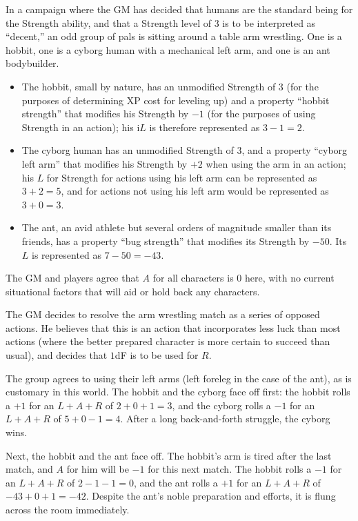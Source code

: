 \begin{example}
In a campaign where the GM has decided that humans are the standard being for the Strength ability,
and that a Strength level of 3 is to be interpreted as ``decent,'' an odd group of pals is sitting around a table arm wrestling.
One is a hobbit, one is a cyborg human with a mechanical left arm, and one is an ant bodybuilder.
\begin{itemize}
\item The hobbit, small by nature, has an unmodified Strength of $3$ (for the purposes of determining XP cost for leveling up) and a property
``hobbit strength'' that modifies his Strength by $-1$ (for the purposes of using Strength in an action); his i$L$ is therefore represented as $3-1=2$.
\item The cyborg human has an unmodified Strength of $3$, and a property ``cyborg left arm'' that modifies his Strength by $+2$ when using the arm in an action;
his $L$ for Strength for actions using his left arm can be represented as $3+2=5$, and for actions not using his left arm would be represented as $3+0=3$.
\item The ant, an avid athlete but several orders of magnitude smaller than its friends, has a property ``bug strength'' that modifies its Strength by $-50$.
Its $L$ is represented as $7-50=-43$.
\end{itemize}
The GM and players agree that $A$ for all characters is $0$ here, with no current situational factors that will aid or hold back any characters.

The GM decides to resolve the arm wrestling match as a series of opposed actions.
He believes that this is an action that incorporates less luck than most actions (where the better prepared character is more certain to succeed than usual),
and decides that $1$dF is to be used for $R$.

The group agrees to using their left arms (left foreleg in the case of the ant), as is customary in this world.
The hobbit and the cyborg face off first:
the hobbit rolls a $+1$ for an $L+A+R$ of $2+0+1=3$, and the cyborg rolls a $-1$ for an $L+A+R$ of $5+0-1=4$.
After a long back-and-forth struggle, the cyborg wins.

Next, the hobbit and the ant face off.
The hobbit’s arm is tired after the last match, and $A$ for him will be $-1$ for this next match.
The hobbit rolls a $-1$ for an $L+A+R$ of $2-1-1=0$, and the ant rolls a $+1$ for an $L+A+R$ of $-43+0+1=-42$.
Despite the ant’s noble preparation and efforts, it is flung across the room immediately.


\end{example}

